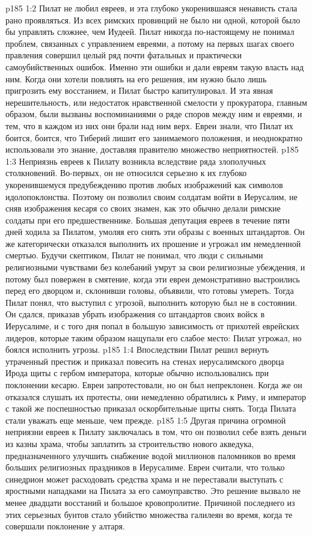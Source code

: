 \vs p185 1:2 Пилат не любил евреев, и эта глубоко укоренившаяся ненависть стала рано проявляться. Из всех римских провинций не было ни одной, которой было бы управлять сложнее, чем Иудеей. Пилат никогда по\hyp{}настоящему не понимал проблем, связанных с управлением евреями, а потому на первых шагах своего правления совершил целый ряд почти фатальных и практически самоубийственных ошибок. Именно эти ошибки и дали евреям такую власть над ним. Когда они хотели повлиять на его решения, им нужно было лишь пригрозить ему восстанием, и Пилат быстро капитулировал. И эта явная нерешительность, или недостаток нравственной смелости у прокуратора, главным образом, были вызваны воспоминаниями о ряде споров между ним и евреями, и тем, что в каждом из них они брали над ним верх. Евреи знали, что Пилат их боится, боится, что Тиберий лишит его занимаемого положения, и неоднократно использовали это знание, доставляя правителю множество неприятностей.
\vs p185 1:3 Неприязнь евреев к Пилату возникла вследствие ряда злополучных столкновений. Во\hyp{}первых, он не относился серьезно к их глубоко укоренившемуся предубеждению против любых изображений как символов идолопоклонства. Поэтому он позволил своим солдатам войти в Иерусалим, не сняв изображения кесаря со своих знамен, как это обычно делали римские солдаты при его предшественнике. Большая депутация евреев в течение пяти дней ходила за Пилатом, умоляя его снять эти образы с военных штандартов. Он же категорически отказался выполнить их прошение и угрожал им немедленной смертью. Будучи скептиком, Пилат не понимал, что люди с сильными религиозными чувствами без колебаний умрут за свои религиозные убеждения, и потому был повержен в смятение, когда эти евреи демонстративно выстроились перед его дворцом и, склонивши головы, объявили, что готовы умереть. Тогда Пилат понял, что выступил с угрозой, выполнить которую был не в состоянии. Он сдался, приказав убрать изображения со штандартов своих войск в Иерусалиме, и с того дня попал в большую зависимость от прихотей еврейских лидеров, которые таким образом нащупали его слабое место: Пилат угрожал, но боялся исполнить угрозы.
\vs p185 1:4 Впоследствии Пилат решил вернуть утраченный престиж и приказал повесить на стенах иерусалимского дворца Ирода щиты с гербом императора, которые обычно использовались при поклонении кесарю. Евреи запротестовали, но он был непреклонен. Когда же он отказался слушать их протесты, они немедленно обратились к Риму, и император с такой же поспешностью приказал оскорбительные щиты снять. Тогда Пилата стали уважать еще меньше, чем прежде.
\vs p185 1:5 \pc Другая причина огромной неприязни евреев к Пилату заключалась в том, что он позволил себе взять деньги из казны храма, чтобы заплатить за строительство нового акведука, предназначенного улучшить снабжение водой миллионов паломников во время больших религиозных праздников в Иерусалиме. Евреи считали, что только синедрион может расходовать средства храма и не переставали выступать с яростными нападками на Пилата за его самоуправство. Это решение вызвало не менее двадцати восстаний и большое кровопролитие. Причиной последнего из этих серьезных бунтов стало убийство множества галилеян во время, когда те совершали поклонение у алтаря.
